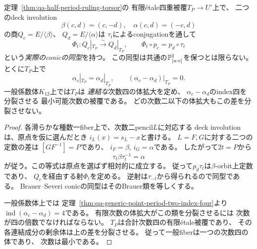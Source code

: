\begin{proposition}[半周期による二conicの同型とBrauer差の最小分裂]
\label{prop:qa-half-period-conic-isomorphism}
定理~\ref{thm:qa-half-period-ruling-torsor}の
有限\'{e}tale四重被覆$T_P\to U^\circ$上で、
二つのdeck involution
\[
 \beta(c,d)=(c,-d),\quad
 \alpha(c,d)=(-c,d)
\]
の商$Q_c=E/\langle\beta\rangle$、
$Q_d=E/\langle\alpha\rangle$は
$\tau_t$によるconjugationを通して
\begin{equation}
 \Phi_t:Q_c|_{T_P}\xrightarrow{\sim}Q_d|_{T_P},
 \qquad
 \Phi_t\circ p_c=p_d\circ\tau_t
 \label{eq:qa-half-period-conic-iso}
\end{equation}
という\emph{実際のconicの同型}を持つ。
この同型は共通の$\mathbb P^1_{[u:v]}$を保つとは限らない。
とくに$T_P$上で
\[
 \alpha_c|_{T_P}=\alpha_d|_{T_P},\qquad
 (\alpha_c-\alpha_d)|_{T_P}=0 .
\]
一般係数体$K_{12}$上では$T_P$は
\emph{連結な}次数四の体拡大を定め、
$\alpha_c-\alpha_d$のindex四を分裂させる
最小可能次数の被覆である。
どの次数二以下の体拡大もこの差を分裂させない。
\end{proposition}
\begin{proof}
各滑らかな種数一fiber上で、次数二pencil$L$に対応する
deck involutionは、原点を仮に選んだとき
$i_L(x)=s_L-x$と書ける。
$L=F,G$に対する二つの定数の差は
$[GF^{-1}]=P$であり、
$i_F=\beta$, $i_G=\alpha$である。
したがって$2t=P$から
\[
 \tau_t\beta\tau_t^{-1}=\alpha
\]
が従う。この等式は原点を選ばず相対的に成立する。
従って$p_d\tau_t$は$\beta$-orbit上定数であり、
$Q_c$を経由する射$\Phi_t$を定める。
逆射は$\tau_{-t}$から得られるので同型である。
Brauer--Severi conicの同型はそのBrauer類を等しくする。

一般係数体上では
定理~\ref{thm:qa-generic-point-period-two-index-four}より
$\operatorname{ind}(\alpha_c-\alpha_d)=4$である。
有限次数の体拡大がこの類を分裂させるには
次数が四の倍数でなければならない。
$T_P$は合計次数四の有限\'{e}tale被覆であり、
その各連結成分の剰余体は上の差を分裂させる。
従って一般fiberは一つの次数四の体であり、
次数は最小である。
\end{proof}

